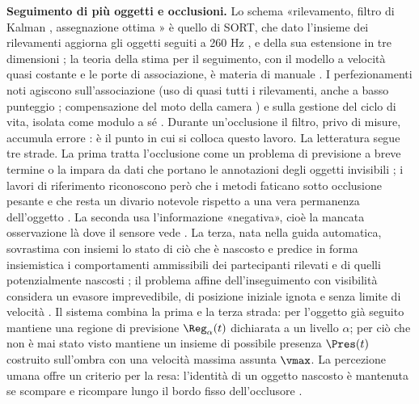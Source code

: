 \textbf{Seguimento di più oggetti e occlusioni.} Lo schema «rilevamento, filtro di Kalman \cite{kalman1960}, assegnazione ottima \cite{kuhn1955}» è quello di SORT, che dato l'insieme dei rilevamenti aggiorna gli oggetti seguiti a 260 Hz \cite{bewley2016}, e della sua estensione in tre dimensioni \cite{weng2020}; la teoria della stima per il seguimento, con il modello a velocità quasi costante e le porte di associazione, è materia di manuale \cite{barshalom2001}. I perfezionamenti noti agiscono sull'associazione (uso di quasi tutti i rilevamenti, anche a basso punteggio \cite{zhang2022}; compensazione del moto della camera \cite{aharon2022}) e sulla gestione del ciclo di vita, isolata come modulo a sé \cite{pang2021}. Durante un'occlusione il filtro, privo di misure, accumula errore \cite{cao2023}: è il punto in cui si colloca questo lavoro. La letteratura segue tre strade. La prima tratta l'occlusione come un problema di previsione a breve termine \cite{khurana2021} o la impara da dati che portano le annotazioni degli oggetti invisibili \cite{tokmakov2021}; i lavori di riferimento riconoscono però che i metodi faticano sotto occlusione pesante \cite{hsieh2023} e che resta un divario notevole rispetto a una vera permanenza dell'oggetto \cite{vanhoorick2023}. La seconda usa l'informazione «negativa», cioè la mancata osservazione là dove il sensore vede \cite{koch2007,wyffels2015,krejci2026}. La terza, nata nella guida automatica, sovrastima con insiemi lo stato di ciò che è nascosto \cite{orzechowski2018} e predice in forma insiemistica i comportamenti ammissibili dei partecipanti rilevati e di quelli potenzialmente nascosti \cite{koschi2021}; il problema affine dell'inseguimento con visibilità considera un evasore imprevedibile, di posizione iniziale ignota e senza limite di velocità \cite{guibas1997}. Il sistema combina la prima e la terza strada: per l'oggetto già seguito mantiene una regione di previsione $\Reg_\alpha(t)$ dichiarata a un livello $\alpha$; per ciò che non è mai stato visto mantiene un insieme di possibile presenza $\Pres(t)$ costruito sull'ombra con una velocità massima assunta $\vmax$. La percezione umana offre un criterio per la resa: l'identità di un oggetto nascosto è mantenuta se scompare e ricompare lungo il bordo fisso dell'occlusore \cite{scholl1999}.

